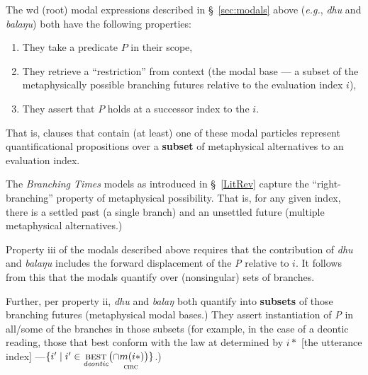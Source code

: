 The \gls{wd} (root) modal expressions described in \S~\ref{sec:modals} above (\textit{e.g.}, \textit{dhu} and \textit{balaŋu}) both have the following properties:
\begin{enumerate}[\bf\sf i]
	\item  They take a predicate $ \mathit P $ in their scope, 
	\item  They retrieve a ``restriction'' from context (the modal base --- a subset of the metaphysically possible branching futures relative to the evaluation index $ i $),
	\item They assert that $ \mathit P $ holds at a successor index to the $ i $.

\end{enumerate} That is, clauses that contain (at least) one of these modal particles represent quantificational propositions over a \textbf{subset} of metaphysical alternatives to an evaluation index.

 The \textit{Branching Times} models as introduced in \S~\ref{LitRev} capture the ``right-branching'' property of metaphysical possibility. That is, for any given index, there is a settled past (a single branch) and an unsettled future (multiple metaphysical alternatives.) 
 
 Property \textsf{iii} of the modals described above requires that the contribution of \textit{dhu} and \textit{balaŋu} includes the forward displacement of the \textit{P} relative to $ i $. It follows from this that the modals quantify over (nonsingular) sets of branches.

 
 Further, per property \textsf{ii}, \textit{dhu} and \textit{balaŋ} both quantify into \textbf{subsets} of those branching futures (metaphysical modal bases.) They assert instantiation of \textit{P} in all/some of the branches in those subsets (for example, in the case of a deontic reading, those that best conform with the law at determined by $ i* $ [the utterance index] ---$ \{i'\mid i'\in \underset{\textit{deontic}}{\textsc{best}}\big(\underset{\textsc{circ}}{\cap m(i*)\big)}\} $.) 


